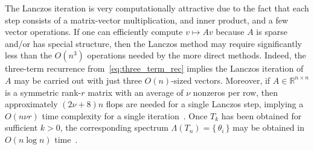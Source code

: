 \documentclass[10pt]{article}
\newcommand{\+}{%
	\raisebox{0.18ex}{\scaleobj{0.55}{+}}
}
\begin{document}
The Lanczos iteration is very computationally attractive due to the fact that each step consists of a matrix-vector multiplication, and inner product, and a few vector operations. If one can efficiently compute $v \mapsto Av$ because $A$ is sparse and/or has special structure, then the Lanczos method may require significantly less than the $O(n^3)$ operations needed by the more direct methods. 
Indeed, the three-term recurrence from~\eqref{eq:three_term_rec} implies the Lanczos iteration of $A$ may be carried out with just three $O(n)$-sized vectors. Moreover, if $A \in \mathbb{R}^{n \times n}$ is a symmetric rank-$r$ matrix with an average of $\nu$ nonzeros per row, then approximately $(2\nu + 8)n$ flops are needed for a single Lanczos step, implying a $O(n\nu r)$ time complexity for a single iteration~\cite{golub2013matrix}. Once $T_k$ has been obtained for sufficient $k > 0$, the corresponding spectrum $\Lambda(T_n) = \{\, \theta_i \,\}$ may be obtained in $O(n \log n)$ time~\cite{}. 
\end{document}
